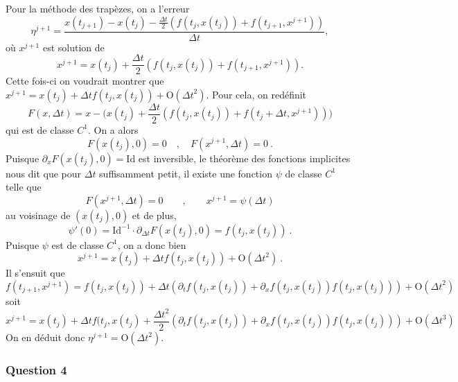 Pour la méthode des trapèzes, on a l'erreur \[
\eta^{j+1} = \frac{x(t_{j+1}) - x(t_j) - \frac{{\Delta t}}{2} \left(f(t_j,x(t_j))+ f(t_{j+1},x^{j+1})\right)}{{\Delta t}},
\] où \(x^{j+1}\) est solution de \[
x^{j+1} = x(t_j) + \frac{{\Delta t}}{2} \left(f(t_j,x(t_j))+ f(t_{j+1},x^{j+1})\right) .
\] Cette fois-ci on voudrait montrer que
\(x^{j+1} = x(t_j)+{\Delta t}f(t_j, x(t_j)) + \mathrm{O}({\Delta t}^2)\).
Pour cela, on redéfinit \[
F(x,{\Delta t}) = x - \big(x(t_j) +\frac{{\Delta t}}{2} \left(f(t_j,x(t_j))+ f(t_{j}+{\Delta t},x^{j+1})\right) \big) 
\] qui est de classe \(C^1\). On a alors \[
F(x(t_j),0) = 0 \quad , \quad F(x^{j+1},{\Delta t})=0 \ .
\] Puisque \(\partial_x F(x(t_j),0) = \text{Id}\) est inversible, le
théorème des fonctions implicites nous dit que pour \(\Delta t\)
suffisamment petit, il existe une fonction \(\psi\) de classe \(C^1\)
telle que \[
F(x^{j+1},{\Delta t})=0 \qquad , \qquad x^{j+1} = \psi({\Delta t}) 
\] au voisinage de \((x(t_j),0)\) et de plus, \[
\psi'(0) = \text{Id}^{-1} \cdot \partial_{\Delta t} F(x(t_j),0) = f(t_j,x(t_j)) \ .
\] Puisque \(\psi\) est de classe \(C^1\), on a donc bien \[
x^{j+1} = x(t_j)+{\Delta t}f(t_j, x(t_j)) + \mathrm{O}({\Delta t}^2) \ .
\] Il s'ensuit que \[
f(t_{j+1},x^{j+1}) = f(t_j, x(t_j)) + {\Delta t}\left(\partial_t f(t_j,x(t_j)) + \partial_x f(t_j,x(t_j))f(t_j, x(t_j))\right) + \mathrm{O}({\Delta t}^2)
\] soit \[
x^{j+1} = x(t_j) + {\Delta t}f(t_j,x(t_j) + \frac{{\Delta t}^2}{2} \left(\partial_t f(t_j,x(t_j)) + \partial_x f(t_j,x(t_j))f(t_j, x(t_j))\right) + \mathrm{O}({\Delta t}^3)
\] On en déduit donc \(\eta^{j+1}=\mathrm{O}({\Delta t}^2)\).

\hypertarget{ed2-answer-consist-4}{%
\subsubsection*{Question 4}\label{ed2-answer-consist-4}}


